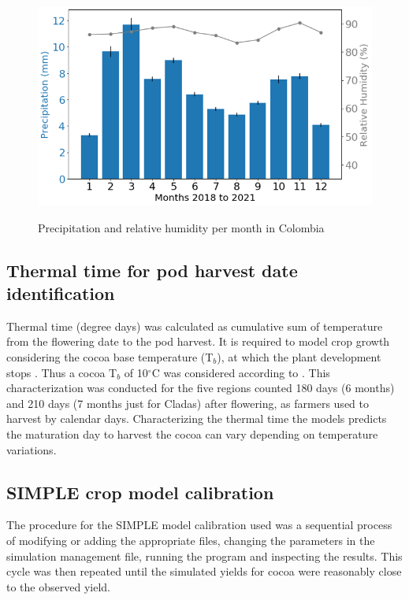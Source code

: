 \documentclass[gene,journal,article,submit,moreauthors,pdftex]{Definitions/mdpi}
\begin{document}
\begin{figure}[h!]
	\centering
	\caption{\footnotesize {Precipitation and relative humidity per month in Colombia \\}}
	\includegraphics[scale=0.4]{images/rainmonth.png}
	\label{fig:rain}
\end{figure}
\newpage

\subsection{Thermal time for pod harvest date identification}
Thermal time (degree days) was calculated as cumulative sum of temperature from the flowering date to the pod harvest. It is required to model crop growth  considering the cocoa base temperature (T$_{b}$), at which the plant development stops \citep{Ritchie1991}. Thus a cocoa T$_{b}$ of 10$^\circ$C was considered according to \cite{lahive2019}. This characterization was conducted for the five regions counted 180 days (6 months) and 210 days (7 months just for Cladas) after flowering, as farmers used to harvest by calendar days. Characterizing the thermal time the models predicts the maturation day to harvest the cocoa can vary depending on temperature variations.    


\subsection{SIMPLE crop model calibration}

The procedure for the SIMPLE model \citep{Zao2019simple}calibration used was a sequential process of modifying or adding the appropriate files, changing the parameters in the simulation management file, running the program and inspecting the results. This cycle was then repeated until the  simulated yields for cocoa were reasonably close to the observed yield. 
\end{document}
